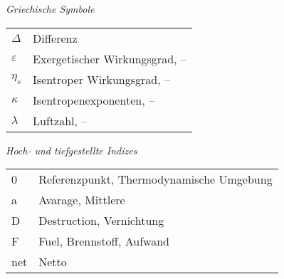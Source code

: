\vspace{18pt}	%
\par
\noindent 
\textit{Griechische Symbole}
\par
\vspace{6pt}
\par
\noindent 
\begin{tabular}{@{}p{2cm}l}
	$\Delta$      & Differenz                      \\
	$\varepsilon$ & Exergetischer Wirkungsgrad, -- \\
	$\eta_s$      & Isentroper Wirkungsgrad, --    \\
	$\kappa$      & Isentropenexponenten, --       \\
	$\lambda$     & Luftzahl, --
\end{tabular}
\clearpage
\par
\noindent 
\textit{Hoch- und tiefgestellte Indizes}
\par
\vspace{6pt}
\par
\noindent 
\begin{tabular}{@{}p{2cm}l}
	0   & Referenzpunkt, Thermodynamische Umgebung \\
	a   & Avarage, Mittlere                        \\
	D   & Destruction, Vernichtung                 \\
	F   & Fuel, Brennstoff, Aufwand                \\
	net & Netto
\end{tabular}
